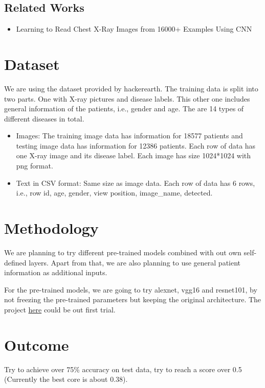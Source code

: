 \documentclass[10pt,twocolumn,letterpaper]{article}
\begin{document}
    \subsection{Related Works}
        \begin{itemize}
            \item Learning to Read Chest X-Ray Images from 16000+ Examples Using CNN \cite{dong2017learning}
        \end{itemize}

\section{Dataset}
We are using the dataset provided by hackerearth. The training data is split into two parts. One with X-ray pictures and disease labels. This other one includes general information of the patients, i.e., gender and age. The are 14 types of different diseases in total.

\begin{itemize}
	\item Images:  The training image data has information for 18577 patients and testing image data has information for 12386 patients. Each row of data has one X-ray image and its disease label. Each image has size 1024*1024 with png format.
	\item Text in CSV format: Same size as image data. Each row of data has 6 rows, i.e., row id, age, gender, view position, image\_name, detected.
\end{itemize}

\section{Methodology}
We are planning to try different pre-trained models combined with out own self-defined layers. Apart from that, we are also planning to use general patient information as additional inputs.

For the pre-trained models, we are going to try alexnet, vgg16 and resnet101, by not freezing the pre-trained parameters but keeping the original architecture. The project \href{https://github.com/ayush1997/Xvision}{here} could be out first trial.

\section{Outcome}
    Try to achieve over 75\% accuracy on test data, try to reach a score over 0.5 (Currently the best core is about 0.38).

{\small


}
\end{document}
